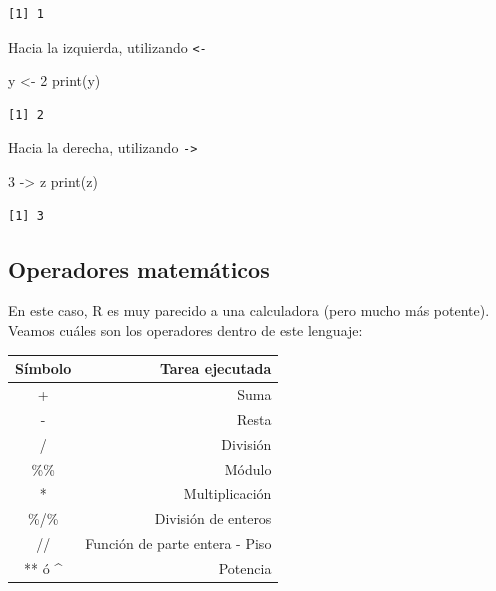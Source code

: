\documentclass[
  letterpaper,
  DIV=11,
  numbers=noendperiod]{scrartcl}
\newenvironment{Shaded}{\begin{snugshade}}{\end{snugshade}}
\newcommand{\DecValTok}[1]{\textcolor[rgb]{0.68,0.00,0.00}{#1}}
\newcommand{\FunctionTok}[1]{\textcolor[rgb]{0.28,0.35,0.67}{#1}}
\newcommand{\NormalTok}[1]{\textcolor[rgb]{0.00,0.23,0.31}{#1}}
\newcommand{\OtherTok}[1]{\textcolor[rgb]{0.00,0.23,0.31}{#1}}
\newcounter{none} %
\begin{document}
\begin{verbatim}
[1] 1
\end{verbatim}

Hacia la izquierda, utilizando \texttt{\textless{}-}

\begin{Shaded}
\begin{Highlighting}[]
\NormalTok{y }\OtherTok{\textless{}{-}} \DecValTok{2}
\FunctionTok{print}\NormalTok{(y)}
\end{Highlighting}
\end{Shaded}

\begin{verbatim}
[1] 2
\end{verbatim}

Hacia la derecha, utilizando \texttt{-\textgreater{}}

\begin{Shaded}
\begin{Highlighting}[]
\DecValTok{3} \OtherTok{{-}\textgreater{}}\NormalTok{ z}
\FunctionTok{print}\NormalTok{(z)}
\end{Highlighting}
\end{Shaded}

\begin{verbatim}
[1] 3
\end{verbatim}

\subsection{Operadores matemáticos}\label{operadores-matemuxe1ticos}

En este caso, R es muy parecido a una calculadora (pero mucho más
potente). Veamos cuáles son los operadores dentro de este lenguaje:

{\def\LTcaptype{none} %
\begin{longtable}[]{@{}cr@{}}
\toprule\noalign{}
Símbolo & Tarea ejecutada \\
\midrule\noalign{}
\endhead
\bottomrule\noalign{}
\endlastfoot
+ & Suma \\
- & Resta \\
/ & División \\
\%\% & Módulo \\
* & Multiplicación \\
\%/\% & División de enteros \\
// & Función de parte entera - Piso \\
** ó \^{} & Potencia \\
\end{longtable}
}
\end{document}
